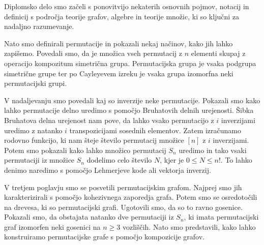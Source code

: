 \documentclass[a4paper, 12pt]{book}
\begin{document}
Diplomsko delo smo začeli s ponovitvijo nekaterih osnovnih pojmov, notacij in definicij s področja teorije grafov, algebre in teorije množic, ki so ključni za nadaljno razumevanje.

Nato smo definirali permutacije in pokazali nekaj načinov, kako jih lahko zapišemo. Povedali smo, da je množica vseh permutacij z $n$ elementi skupaj z operacijo kompozitum simetrična grupa. Permutacijska grupa je vsaka podgrupa simetrične grupe ter po Cayleyevem izreku je vsaka grupa izomorfna neki permutacijski grupi.

V nadaljevanju smo povedali kaj so inverzije neke permutacije. Pokazali smo kako lahko permutacije delno uredimo s pomočjo Bruhatovih delnih urejenosti. Šibka Bruhatova delna urejenost nam pove, da lahko vsako permutacijo z $i$ inverzijami uredimo z natanko $i$ transpozicijami sosednih elementov. Zatem izračunamo rodovno funkcijo, ki nam šteje število permutacij množice $[n]$ z $i$ inverzijami. Potem smo pokazali kako lahko množico permutacij $S_n$ uredimo in tako vsaki permutaciji iz množice $S_n$ dodelimo celo število $N$, kjer je $0 \leq N \leq n!$. To lahko denimo naredimo s pomočjo Lehmerjeve kode ali vektorja inverzij.

V tretjem poglavju smo se posvetili permutacijskim grafom. Najprej smo jih karakterizirali s pomočjo kohezivnega zaporedja grafa. Potem smo se osredotočili na drevesa, ki so permutacijski grafi. Ugotovili smo, da so to ravno gosenice. Pokazali smo, da obstajata natanko dve permutaciji iz $S_n$, ki imata permutacijski graf izomorfen neki gosenici na $n \geq 3$ vozliščih. Nato smo predstavili, kako lahko konstruiramo permutacijske grafe s pomočjo kompozicije grafov.
\end{document}
